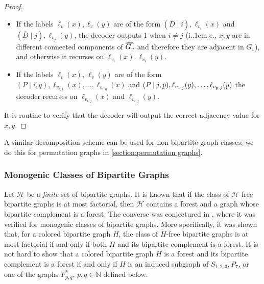 \documentclass{theoretics}
\makeatletter
\newcommand\eqLabelSep{\mathbin|}
\newcommand{\cH}{\ensuremath{\mathcal{H}}}
\newcommand{\cQ}{\ensuremath{\mathcal{Q}}}
\newcommand\splitaftercomma[1]{%
  \begingroup
  \begingroup\lccode`~=`, \lowercase{\endgroup
    \edef~{\mathchar\the\mathcode`, \penalty0 \noexpand\hspace{0pt plus .25em}}%
  }\mathcode`,="8000 #1%
  \endgroup
}
\newcommand*\ie{i.\kern.1em e.\@\xspace} %
\newcommand\doverline[1]{%
  \setbox0=\hbox{$\!\overline{#1}\!$}%
  \ht0=\dimexpr\ht0-.2ex\relax%
  \,\overline{\copy0}\,%
}
\newcommand{\bc}[1]{\doverline{#1}} %
\makeatother
\begin{document}
\begin{proof}
\begin{itemize}
\item If the labels $\ell_v(x),\ell_v(y)$ are of the form $(\overline D \eqLabelSep i), \ell_{v_i}(x)$ and
$(\overline D \eqLabelSep j), \ell_{v_j}(y)$, the decoder outputs 1 when $i \neq j$ (\ie, $x,y$ are in different connected
components of $\bc{G_v}$ and therefore they are adjacent in $G_v$), and otherwise it
recurses on $\ell_{v_i}(x), \ell_{v_i}(y)$.

\item If the labels $\ell_v(x)$, $\ell_v(y)$ are of the form $(P \eqLabelSep i, q), \ell_{v_{i,1}}(x), \dotsc, \ell_{v_{i,q}}(x)$
and $\splitaftercomma{(P \eqLabelSep j, p), \ell_{v_{1,j}}(y), \dotsc, \ell_{v_{p,j}}(y)}$ the decoder recurses on 
$\ell_{v_{i,j}}(x)$ and $\ell_{v_{i,j}}(y)$.
\end{itemize}
It is routine to verify that the decoder will output the correct adjacency value for $x,y$.
\end{proof}


\begin{remark}[$(\cQ,k)$-tree for general graphs]
A similar decomposition scheme can be used for non-bipartite graph classes; we do this for
permutation graphs in \cref{section:permutation graphs}.
\end{remark}




\subsubsection{Monogenic Classes of Bipartite Graphs}
\label{sec:mono-bip-graph-families}

Let $\cH$ be a \emph{finite} set of bipartite graphs. It is known \cite{All09} that if the class of
$\cH$-free bipartite graphs is at most factorial, then $\cH$ contains a forest and a graph whose bipartite complement is a forest. The converse was conjectured in \cite{LZ17}, where it was verified for monogenic classes of bipartite graphs. More specifically, 
it was shown that, for a colored bipartite graph $H$, the class of $H$-free bipartite graphs is at most factorial if and only if both $H$ and its bipartite complement is a forest.  
It is not hard to show that a colored bipartite graph $H$ is a forest and its bipartite complement is
a forest if and only if $H$ is an induced subgraph of $S_{1,2,3}, P_7$, or one of the graphs $F_{p,q}^*$, $p,q \in \mathbb{N}$ defined below.
\end{document}
